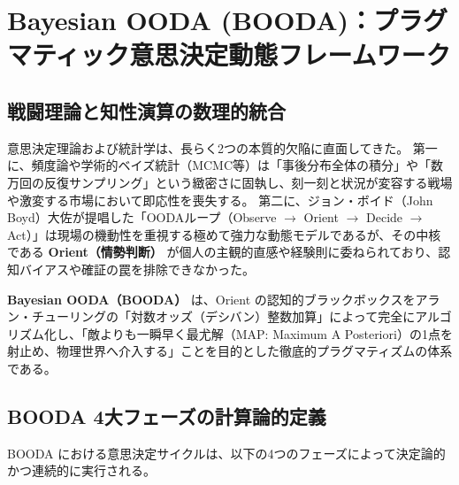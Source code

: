 \section{Bayesian OODA (BOODA)：プラグマティック意思決定動態フレームワーク}
\label{sec:booda_framework}

\subsection{戦闘理論と知性演算の数理的統合}
意思決定理論および統計学は、長らく2つの本質的欠陥に直面してきた。
第一に、頻度論や学術的ベイズ統計（MCMC等）は「事後分布全体の積分」や「数万回の反復サンプリング」という緻密さに固執し、刻一刻と状況が変容する戦場や激変する市場において即応性を喪失する。
第二に、ジョン・ボイド（John Boyd）大佐が提唱した「OODAループ（Observe $\to$ Orient $\to$ Decide $\to$ Act）」は現場の機動性を重視する極めて強力な動態モデルであるが、その中核である \textbf{Orient（情勢判断）} が個人の主観的直感や経験則に委ねられており、認知バイアスや確証の罠を排除できなかった。

\textbf{Bayesian OODA（BOODA）} は、Orient の認知的ブラックボックスをアラン・チューリングの「対数オッズ（デシバン）整数加算」によって完全にアルゴリズム化し、「敵よりも一瞬早く最尤解（MAP: Maximum A Posteriori）の1点を射止め、物理世界へ介入する」ことを目的とした徹底的プラグマティズムの体系である。

\subsection{BOODA 4大フェーズの計算論的定義}

BOODA における意思決定サイクルは、以下の4つのフェーズによって決定論的かつ連続的に実行される。

